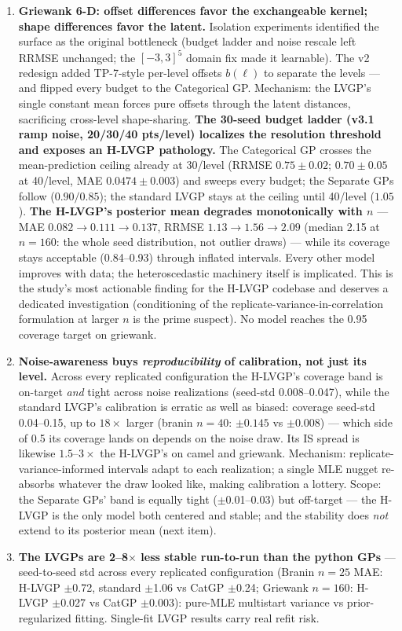 \begin{enumerate}
\item \textbf{Griewank 6-D: offset differences favor the exchangeable kernel; shape
differences favor the latent.} Isolation experiments identified the surface as the original
bottleneck (budget ladder and noise rescale left RRMSE unchanged; the $[-3,3]^5$ domain fix
made it learnable). The v2 redesign added TP-7-style per-level offsets $b(\ell)$ to separate
the levels --- and flipped every budget to the Categorical GP. Mechanism: the LVGP's single
constant mean forces pure offsets through the latent distances, sacrificing cross-level
shape-sharing. \textbf{The 30-seed budget ladder (v3.1 ramp noise, 20/30/40 pts/level)
localizes the resolution threshold and exposes an H-LVGP pathology.} The Categorical GP
crosses the mean-prediction ceiling already at 30/level (RRMSE $0.75\pm0.02$; $0.70\pm0.05$
at 40/level, MAE $0.0474\pm0.003$) and sweeps every budget; the Separate GPs follow
($0.90/0.85$); the standard LVGP stays at the ceiling until 40/level ($1.05$). \textbf{The
H-LVGP's posterior mean degrades monotonically with $n$} --- MAE $0.082\to0.111\to0.137$,
RRMSE $1.13\to1.56\to2.09$ (median 2.15 at $n=160$: the whole seed distribution, not outlier
draws) --- while its coverage stays acceptable (0.84--0.93) through inflated intervals. Every
other model improves with data; the heteroscedastic machinery itself is implicated. This is
the study's most actionable finding for the H-LVGP codebase and deserves a dedicated
investigation (conditioning of the replicate-variance-in-correlation formulation at larger
$n$ is the prime suspect). No model reaches the 0.95 coverage target on griewank.

\item \textbf{Noise-awareness buys \emph{reproducibility} of calibration, not just its
level.} Across every replicated configuration the H-LVGP's coverage band is on-target
\emph{and} tight across noise realizations (seed-std 0.008--0.047), while the standard LVGP's
calibration is erratic as well as biased: coverage seed-std 0.04--0.15, up to $18\times$
larger (branin $n=40$: $\pm0.145$ vs $\pm0.008$) --- which side of 0.5 its coverage lands on
depends on the noise draw. Its IS spread is likewise $1.5$--$3\times$ the H-LVGP's on camel
and griewank. Mechanism: replicate-variance-informed intervals adapt to each realization; a
single MLE nugget re-absorbs whatever the draw looked like, making calibration a lottery.
Scope: the Separate GPs' band is equally tight ($\pm$0.01--0.03) but off-target --- the
H-LVGP is the only model both centered and stable; and the stability does \emph{not} extend
to its posterior mean (next item).

\item \textbf{The LVGPs are 2--8$\times$ less stable run-to-run than the python GPs} ---
seed-to-seed std across every replicated configuration (Branin $n=25$ MAE: H-LVGP $\pm$0.72,
standard $\pm$1.06 vs CatGP $\pm$0.24; Griewank $n=160$: H-LVGP $\pm$0.027 vs CatGP
$\pm$0.003): pure-MLE multistart variance vs prior-regularized fitting. Single-fit LVGP
results carry real refit risk.
\end{enumerate}

